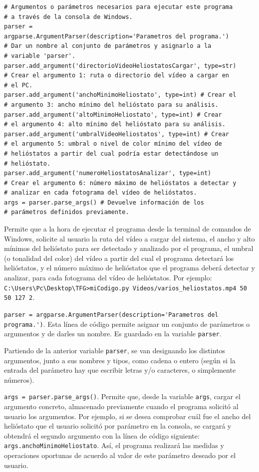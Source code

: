 \begin{lstlisting}
# Argumentos o parámetros necesarios para ejecutar este programa
# a través de la consola de Windows.
parser = 
argparse.ArgumentParser(description='Parametros del programa.')
# Dar un nombre al conjunto de parámetros y asignarlo a la
# variable 'parser'.
parser.add_argument('directorioVideoHeliostatosCargar', type=str)
# Crear el argumento 1: ruta o directorio del vídeo a cargar en
# el PC.
parser.add_argument('anchoMinimoHeliostato', type=int) # Crear el 
# argumento 3: ancho mínimo del helióstato para su análisis.
parser.add_argument('altoMinimoHeliostato', type=int) # Crear
# el argumento 4: alto mínimo del helióstato para su análisis.
parser.add_argument('umbralVideoHeliostatos', type=int) # Crear
# el argumento 5: umbral o nivel de color mínimo del vídeo de
# helióstatos a partir del cual podría estar detectándose un
# helióstato.
parser.add_argument('numeroHeliostatosAnalizar', type=int)
# Crear el argumento 6: número máximo de helióstatos a detectar y
# analizar en cada fotograma del vídeo de helióstatos.
args = parser.parse_args() # Devuelve información de los
# parámetros definidos previamente.
\end{lstlisting}

Permite que a la hora de ejecutar el programa desde la terminal de comandos de Windows, solicite al usuario la ruta del vídeo a cargar del sistema, el ancho y alto mínimos del helióstato para ser detectado y analizado por el programa, el umbral (o tonalidad del color) del vídeo a partir del cual el programa detectará los helióstatos, y el número máximo de helióstatos que el programa deberá detectar y analizar, para cada fotograma del vídeo de helióstatos. Por ejemplo: \verb|C:\Users\Pc\Desktop\TFG>miCodigo.py Videos/varios_heliostatos.mp4 50 50 127 2|.

\verb|parser = argparse.ArgumentParser(description='Parametros del programa.')|. Esta línea de código permite asignar un conjunto de parámetros o argumentos y de darles un nombre. Es guardado en la variable \verb|parser|.

Partiendo de la anterior variable \verb|parser|, se van designando los distintos argumentos, junto a sus nombres y tipos, como cadena o entero (según si la entrada del parámetro hay que escribir letras y/o caracteres, o simplemente números).

\verb|args = parser.parse_args()|. Permite que, desde la variable \verb|args|, cargar el argumento concreto, almacenado previamente cuando el programa solicitó al usuario los argumentos. Por ejemplo, si se desea comprobar cuál fue el ancho del helióstato que el usuario solicitó por parámetro en la consola, se cargará y obtendrá el segundo argumento con la línea de código siguiente: \verb|args.anchoMinimoHeliostato|. Así, el programa realizará las medidas y operaciones oportunas de acuerdo al valor de este parámetro deseado por el usuario.

